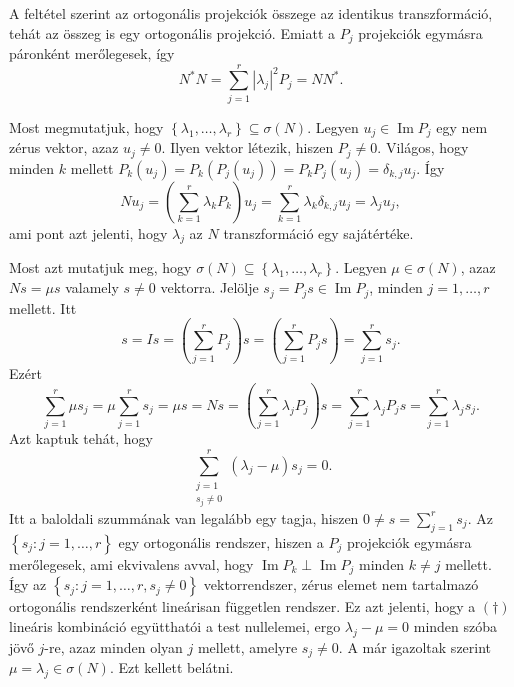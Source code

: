 \documentclass[9pt, a4paper, showtrims]{memoir}
\makeatletter
\renewenvironment{proof}[1][\proofname]
    {\par\pushQED{\qed}%
    \normalfont \topsep6\p@\@plus6\p@\relax
    \trivlist
    \item[\hskip\labelsep
        \itshape
    #1\@addpunct{:}]\ignorespaces}
    {\popQED\endtrivlist\@endpefalse}
\theoremstyle{plain}
\theoremstyle{remark}
\theoremstyle{definition}
\DeclareMathOperator{\im}{Im}
\makeatother
\begin{document}
\begin{proof}
	A feltétel szerint az ortogonális projekciók összege az identikus transzformáció, tehát
	az összeg is egy ortogonális projekció.
	Emiatt a $P_j$ projekciók egymásra páronként merőlegesek,
	így
	\[
		N^\ast N
		=
		\sum_{j=1}^r|\lambda_j|^2P_j
		=
		NN^\ast.
	\]

	Most megmutatjuk, hogy
	$\left\{ \lambda_1,\ldots,\lambda_r \right\}\subseteq \sigma(N)$.
	Legyen $u_j\in\im P_j$ egy nem zérus vektor, azaz $u_j\neq 0$.
	Ilyen vektor létezik, hiszen $P_{j}\neq 0$.
	Világos, hogy minden $k$ mellett
	\begin{math}
		P_k\left( u_j \right)
		=
		P_k\left( P_j\left( u_j \right) \right)
		=
		P_kP_j\left( u_j \right)
		=\delta_{k,j}u_j.
	\end{math}
	Így
	\[
		Nu_j
		=
		\left( \sum_{k=1}^r\lambda_kP_k \right)u_j
		=
		\sum_{k=1}^r\lambda_k\delta_{k,j}u_j
		=
		\lambda_ju_j,
	\]
	ami pont azt jelenti, hogy $\lambda_j$ az $N$ transzformáció egy sajátértéke.

	Most azt mutatjuk meg, hogy
	$\sigma(N)\subseteq \left\{ \lambda_1,\ldots,\lambda_r \right\}$.
	Legyen $\mu\in\sigma(N)$, azaz $Ns=\mu s$ valamely $s\neq 0$ vektorra.
	Jelölje $s_j=P_js\in\im P_j$, minden $j=1,\ldots,r$ mellett.
	Itt
	\[
		s=Is
		=
		\left( \sum_{j=1}^rP_j \right)s
		=
		\left( \sum_{j=1}^rP_js \right)
		=
		\sum_{j=1}^rs_j.
	\]
	Ezért
	\[
		\sum_{j=1}^r\mu s_j
		=
		\mu\sum_{j=1}^rs_j
		=
		\mu s
		=
		Ns
		=
		\left( \sum_{j=1}^r\lambda_jP_j \right)s
		=
		\sum_{j=1}^r\lambda_jP_js
		=
		\sum_{j=1}^r\lambda_js_j.
	\]
	Azt kaptuk tehát, hogy
	\[
		\sum_{\substack{j=1\\s_j\neq 0}}^r\left(\lambda_j-\mu \right)s_j=0.\tag{\dag}
	\]
	Itt a baloldali szummának van legalább egy tagja, hiszen
	\(
	0 \neq s=\sum_{j=1}^rs_j.
	\)
	Az
	$\left\{ s_j:j=1,\ldots,r \right\}$
	egy ortogonális rendszer,
	hiszen a $P_j$ projekciók egymásra merőlegesek, ami ekvivalens avval, hogy
	$\im P_k\perp \im P_j$ minden $k\neq j$ mellett.
	Így az
	$\left\{ s_j:j=1,\ldots,r, s_j\neq 0 \right\}$ vektorrendszer,
	zérus elemet nem tartalmazó ortogonális rendszerként lineárisan független rendszer.
	Ez azt jelenti, hogy a $(\dag)$ lineáris kombináció együtthatói a test nullelemei, ergo
	\begin{math}
		\lambda_j-\mu=0
	\end{math}
	minden szóba jövő $j$-re,
	azaz minden olyan $j$ mellett, amelyre $s_j\neq 0$.
	A már igazoltak szerint
	\begin{math}
		\mu=\lambda_j\in\sigma(N).
	\end{math}
	Ezt kellett belátni.
\end{proof}
\end{document}
